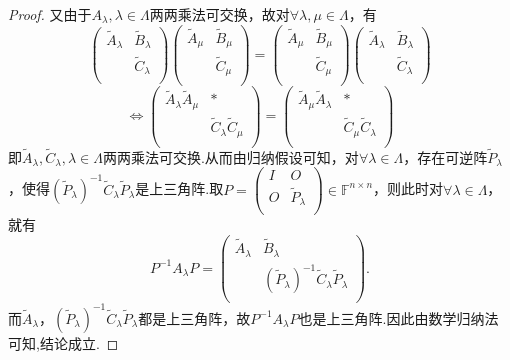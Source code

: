 \documentclass[../../main.tex]{subfiles}%
\begin{document}
\begin{proof}
又由于$A_{\lambda},\lambda \in \Lambda$两两乘法可交换，故对$\forall \lambda ,\mu \in \Lambda$，有
\[
\begin{pmatrix}
\widetilde{A}_{\lambda}&		\widetilde{B}_{\lambda}\\
&		\widetilde{C}_{\lambda}\\
\end{pmatrix} \begin{pmatrix}
\widetilde{A}_{\mu}&		\widetilde{B}_{\mu}\\
&		\widetilde{C}_{\mu}\\
\end{pmatrix} =\begin{pmatrix}
\widetilde{A}_{\mu}&		\widetilde{B}_{\mu}\\
&		\widetilde{C}_{\mu}\\
\end{pmatrix} \begin{pmatrix}
\widetilde{A}_{\lambda}&		\widetilde{B}_{\lambda}\\
&		\widetilde{C}_{\lambda}\\
\end{pmatrix} 
\]
\[
\Longleftrightarrow \begin{pmatrix}
\widetilde{A}_{\lambda}\widetilde{A}_{\mu}&		*\\
&		\widetilde{C}_{\lambda}\widetilde{C}_{\mu}\\
\end{pmatrix} =\begin{pmatrix}
\widetilde{A}_{\mu}\widetilde{A}_{\lambda}&		*\\
&		\widetilde{C}_{\mu}\widetilde{C}_{\lambda}\\
\end{pmatrix} 
\]
即$\widetilde{A}_{\lambda},\widetilde{C}_{\lambda},\lambda \in \Lambda$两两乘法可交换.从而由归纳假设可知，对$\forall \lambda \in \Lambda$，存在可逆阵$\widetilde{P}_{\lambda}$，使得$(\widetilde{P}_{\lambda})^{-1}\widetilde{C}_{\lambda}\widetilde{P}_{\lambda}$是上三角阵.取$P=\begin{pmatrix}
I&		O\\
O&		\widetilde{P}_{\lambda}\\
\end{pmatrix} \in \mathbb{F} ^{n\times n}$，则此时对$\forall \lambda \in \Lambda$，就有
\[
P^{-1}A_{\lambda}P=\begin{pmatrix}
\widetilde{A}_{\lambda}&		\widetilde{B}_{\lambda}\\
&		(\widetilde{P}_{\lambda})^{-1}\widetilde{C}_{\lambda}\widetilde{P}_{\lambda}\\
\end{pmatrix}.
\]
而$\widetilde{A}_{\lambda}$，$(\widetilde{P}_{\lambda})^{-1}\widetilde{C}_{\lambda}\widetilde{P}_{\lambda}$都是上三角阵，故$P^{-1}A_{\lambda}P$也是上三角阵.因此由数学归纳法可知,结论成立.

\end{proof}
\end{document}
